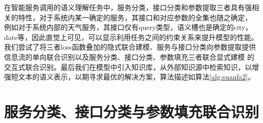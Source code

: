 在智能服务调用的语义理解任务中，服务分类，接口分类和参数提取三者具有强相关的特性，对于系统内某一确定的服务，其接口和对应参数的全集也随之确定，
例如对于系统内部的天气服务，其接口仅有query类型，语义槽也是确定的city，date等，因此直觉上可见，可以显示利用任务之间的约束关系来提升模型的性能。
我们尝试了将三者loss函数叠加的隐式联合建模、服务与接口分类向参数提取提供信息流的单向联合识别以及服务分类、接口分类、参数填充三者联合显式建模
的交互式联合识别。最后我们在模型中引入知识库，从外部知识源中检索知识，以增强短文本的语义表示，以期寻求最优的解决方案，算法描述如算法\ref{alg:suanfa2}。



\section{服务分类、接口分类与参数填充联合识别}
